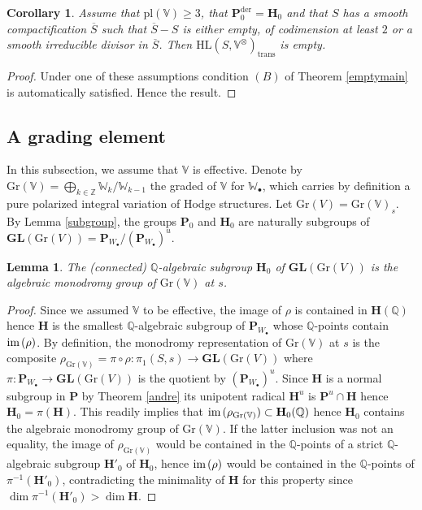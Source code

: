 \documentclass[10pt]{article}
\numberwithin{equation}{subsection}
\theoremstyle{plain}
\newtheorem{lemma}[theorem]{Lemma}
\newtheorem{corollary}[theorem]{Corollary}
\theoremstyle{definition}
\theoremstyle{remark}
\newcommand{\Z}{\mathbb Z}
\newcommand{\Q}{\mathbb Q}
\newcommand{\V}{\mathbb V}
\newcommand{\W}{\mathbb W}
\newcommand{\pp}{\mathbf P}
\newcommand{\mon}{\mathbf H}
\newcommand{\HL}{\mathrm{HL}(S, \V^\otimes)}
\newcommand{\bul}{\bullet}
\newcommand{\im}{\mathrm{im} \hspace{0.05cm}}
\newcommand{\gr}{\mathrm{Gr}}
\newcommand{\gl}{\mathbf{GL}}
\newcommand{\der}{\mathrm{der}}
\newcommand{\trans}{\mathrm{trans}}
\begin{document}
\begin{corollary}\label{critalg}
Assume that $\mathrm{pl}(\V) \geqslant 3$, that $\pp_0^\der = \mon_0$ and that $S$ has a smooth compactification $\overline{S}$ such that $\overline{S}-S$ is either empty, of codimension at least $2$ or a smooth irreducible divisor in $\overline{S}$. Then $\HL_\trans$ is empty.
\end{corollary}
\begin{proof}
Under one of these assumptions condition $(B)$ of Theorem \ref{emptymain} is automatically satisfied. Hence the result.
\end{proof}

\subsection{A grading element}\label{grading}
In this subsection, we assume that $\V$ is effective. Denote by $\gr(\V) = \bigoplus_{k \in \Z} \W_k/\W_{k-1}$ the graded of $\V$ for $\W_\bul$, which carries by definition a pure polarized integral variation of Hodge structures. Let $\gr(V) = \gr(\V)_s$. By Lemma \ref{subgroup}, the groups $\pp_0$ and $\mon_0$ are naturally subgroups of $\gl(\gr(V)) = \pp_{W_\bul}/(\pp_{W_\bul})^u$.
\begin{lemma}\label{monpure}
The (connected) $\Q$-algebraic subgroup $\mon_0$ of $\gl(\gr(V))$ is the algebraic monodromy group of $\gr(\V)$ at $s$.
\end{lemma}
\begin{proof}
Since we assumed $\V$ to be effective, the image of $\rho$ is contained in $\mon(\Q)$ hence $\mon$ is the smallest $\Q$-algebraic subgroup of $\pp_{W_\bul}$ whose $\Q$-points contain $\im(\rho)$. By definition, the monodromy representation of $\gr(\V)$ at $s$ is the composite $\rho_{\gr(\V)} = \pi \circ \rho : \pi_1(S,s) \rightarrow \gl(\gr(V))$ where $\pi : \pp_{W_\bul} \rightarrow \gl(\gr(V))$ is the quotient by $(\pp_{W_\bul})^u$. Since $\mon$ is a normal subgroup in $\pp$ by Theorem \ref{andre} its unipotent radical $\mon^u$ is $\pp^u \cap \mon$ hence $\mon_0 = \pi(\mon)$. This readily implies that $\im(\rho_{\gr(\V)}) \subset \mon_0(\Q)$ hence $\mon_0$ contains the algebraic monodromy group of $\gr(\V)$. If the latter inclusion was not an equality, the image of $\rho_{\gr(\V)}$ would be contained in the $\Q$-points of a strict $\Q$-algebraic subgroup $\mon'_0$ of $\mon_0$, hence $\im(\rho)$ would be contained in the $\Q$-points of $\pi^{-1}(\mon'_0)$, contradicting the minimality of $\mon$ for this property since $\dim \pi^{-1}(\mon'_0)  > \dim \mon$.
\end{proof}
\end{document}
